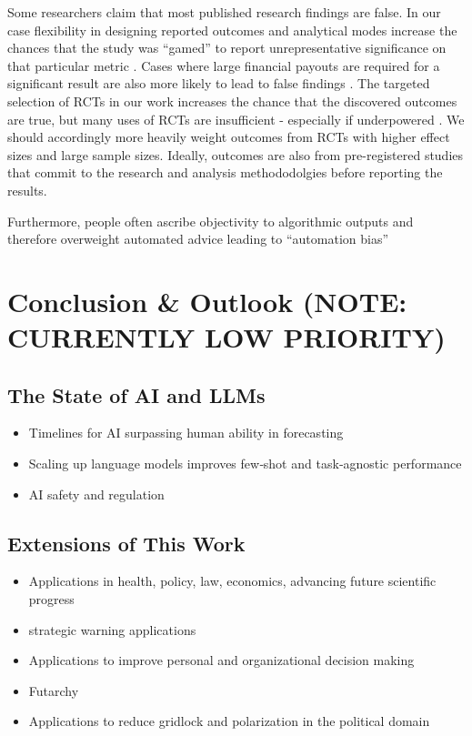 \documentclass[12pt,a4paper]{article}
\begin{document}
Some researchers claim that most published research findings are false. In our case flexibility in designing reported outcomes and analytical modes increase the chances that the study was ``gamed'' to report unrepresentative significance on that particular metric . Cases where large financial payouts are required for a significant result are also more likely to lead to false findings . The targeted selection of RCTs in our work increases the chance that the discovered outcomes are true, but many uses of RCTs are insufficient - especially if underpowered . We should accordingly more heavily weight outcomes from RCTs with higher effect sizes and large sample sizes. Ideally, outcomes are also from pre-registered studies that commit to the research and analysis methododolgies before reporting the results.

Furthermore, people often ascribe objectivity to algorithmic outputs and therefore overweight automated advice leading to ``automation bias'' 

\clearpage
\section{Conclusion \& Outlook (NOTE: CURRENTLY LOW PRIORITY)} %
\label{sec:conclusion_outlook}
\subsection{The State of AI and LLMs}
\begin{itemize}
  \item Timelines for AI surpassing human ability in forecasting 
  \item Scaling up language models improves few‑shot and task‑agnostic performance 
  \item AI safety and regulation
\end{itemize}
\subsection{Extensions of This Work}
\begin{itemize}
  \item Applications in health, policy, law, economics, advancing future scientific progress
  \item strategic warning applications 
  \item Applications to improve personal and organizational decision making
  \item Futarchy   
  \item Applications to reduce gridlock and polarization in the political domain
\end{itemize}
\end{document}
